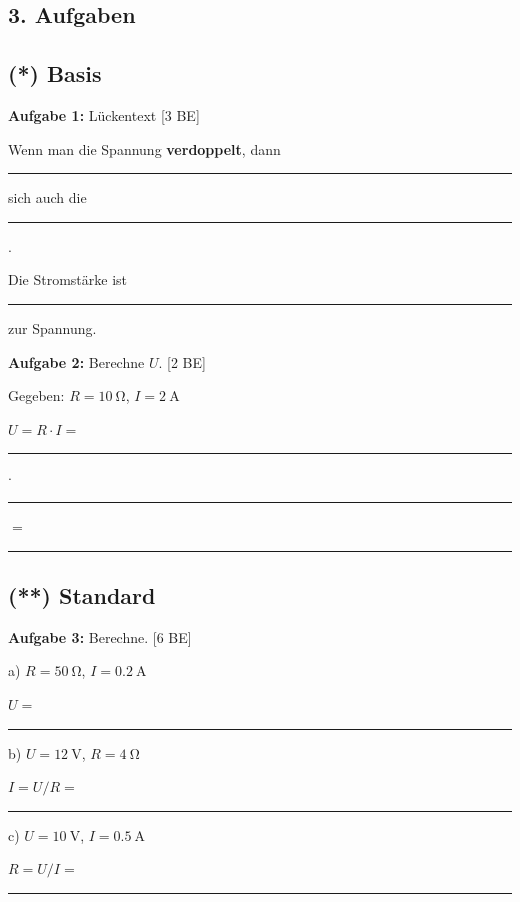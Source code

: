 \documentclass[10pt, a4paper]{article}
\newcommand{\luecke}[1]{\rule{#1}{0.4pt}}
\newcommand{\niveauEins}{\textcolor{stern1}{\textbf{(*)}}}
\newcommand{\niveauZwei}{\textcolor{stern2}{\textbf{(**)}}}
\newcommand{\punkte}[1]{\hfill\textcolor{grau}{\small[#1 BE]}}
\begin{document}

\begin{multicols}{2}

\section*{3. Aufgaben}

\subsection*{\niveauEins{} Basis}

\textbf{Aufgabe 1:} Lückentext \punkte{3}

Wenn man die Spannung \textbf{verdoppelt}, dann \luecke{2cm} sich auch die \luecke{2cm}.

Die Stromstärke ist \luecke{2cm} zur Spannung.

\vspace{0.8em}

\textbf{Aufgabe 2:} Berechne $U$. \punkte{2}

Gegeben: $R = \SI{10}{\ohm}$, $I = \SI{2}{\ampere}$

$U = R \cdot I = $ \luecke{1cm} $\cdot$ \luecke{1cm} $=$ \luecke{1.5cm}

\vspace{0.8em}

\subsection*{\niveauZwei{} Standard}

\textbf{Aufgabe 3:} Berechne. \punkte{6}

a) $R = \SI{50}{\ohm}$, $I = \SI{0,2}{\ampere}$

\quad $U = $ \luecke{2.5cm}

\vspace{0.5em}

b) $U = \SI{12}{\volt}$, $R = \SI{4}{\ohm}$

\quad $I = U/R = $ \luecke{2.5cm}

\vspace{0.5em}

c) $U = \SI{10}{\volt}$, $I = \SI{0,5}{\ampere}$

\quad $R = U/I = $ \luecke{2.5cm}

\vspace{0.8em}


\end{multicols}
\end{document}
